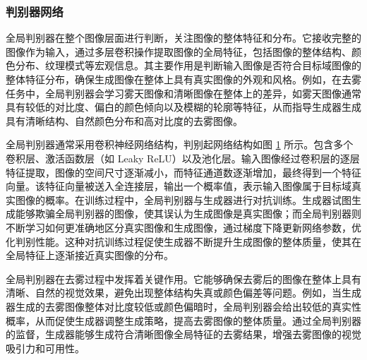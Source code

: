 \subsubsection{判别器网络}

全局判别器在整个图像层面进行判断，关注图像的整体特征和分布。它接收完整的图像作为输入，通过多层卷积操作提取图像的全局特征，包括图像的整体结构、颜色分布、纹理模式等宏观信息。其主要作用是判断输入图像是否符合目标域图像的整体特征分布，确保生成图像在整体上具有真实图像的外观和风格。例如，在去雾任务中，全局判别器会学习雾天图像和清晰图像在整体上的差异，如雾天图像通常具有较低的对比度、偏白的颜色倾向以及模糊的轮廓等特征，从而指导生成器生成具有清晰结构、自然颜色分布和高对比度的去雾图像。

全局判别器通常采用卷积神经网络结构，判别起网络结构如图 \ref{fig:dnet} 所示。包含多个卷积层、激活函数层（如 Leaky ReLU）以及池化层。输入图像经过卷积层的逐层特征提取，图像的空间尺寸逐渐减小，而特征通道数逐渐增加，最终得到一个特征向量。该特征向量被送入全连接层，输出一个概率值，表示输入图像属于目标域真实图像的概率。在训练过程中，全局判别器与生成器进行对抗训练。生成器试图生成能够欺骗全局判别器的图像，使其误认为生成图像是真实图像；而全局判别器则不断学习如何更准确地区分真实图像和生成图像，通过梯度下降更新网络参数，优化判别性能。这种对抗训练过程促使生成器不断提升生成图像的整体质量，使其在全局特征上逐渐接近真实图像的分布。

\begin{figure}[htb]
    \centering
    \captionsetup{font=footnotesize}
    \label{fig:dnet}
\end{figure}


全局判别器在去雾过程中发挥着关键作用。它能够确保去雾后的图像在整体上具有清晰、自然的视觉效果，避免出现整体结构失真或颜色偏差等问题。例如，当生成器生成的去雾图像整体对比度较低或颜色偏暗时，全局判别器会给出较低的真实性概率，从而促使生成器调整生成策略，提高去雾图像的整体质量。通过全局判别器的监督，生成器能够生成符合清晰图像全局特征的去雾结果，增强去雾图像的视觉吸引力和可用性。

